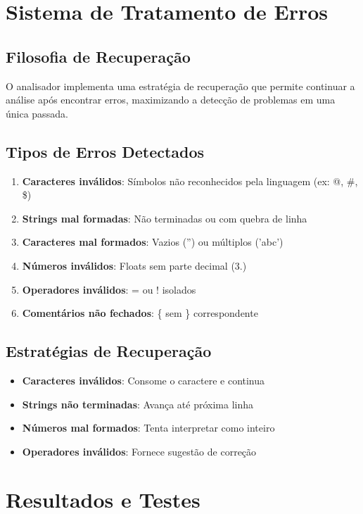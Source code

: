 \documentclass[12pt]{article}
\begin{document}
\section{Sistema de Tratamento de Erros}

\subsection{Filosofia de Recuperação}
O analisador implementa uma estratégia de recuperação que permite continuar a análise após encontrar erros, maximizando a detecção de problemas em uma única passada.

\subsection{Tipos de Erros Detectados}
\begin{enumerate}
    \item \textbf{Caracteres inválidos}: Símbolos não reconhecidos pela linguagem (ex: @, \#, \$)
    \item \textbf{Strings mal formadas}: Não terminadas ou com quebra de linha
    \item \textbf{Caracteres mal formados}: Vazios ('') ou múltiplos ('abc')
    \item \textbf{Números inválidos}: Floats sem parte decimal (3.)
    \item \textbf{Operadores inválidos}: = ou ! isolados
    \item \textbf{Comentários não fechados}: \{ sem \} correspondente
\end{enumerate}

\subsection{Estratégias de Recuperação}
\begin{itemize}[noitemsep]
    \item \textbf{Caracteres inválidos}: Consome o caractere e continua
    \item \textbf{Strings não terminadas}: Avança até próxima linha
    \item \textbf{Números mal formados}: Tenta interpretar como inteiro
    \item \textbf{Operadores inválidos}: Fornece sugestão de correção
\end{itemize}

\section{Resultados e Testes}
\end{document}
